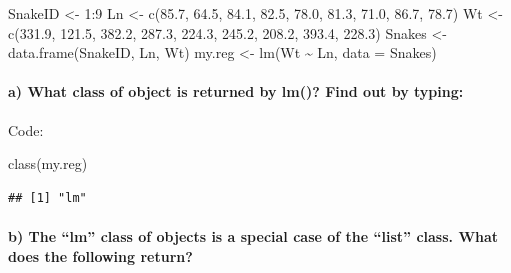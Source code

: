 \documentclass[
]{article}
\newenvironment{Shaded}{\begin{snugshade}}{\end{snugshade}}
\newcommand{\AttributeTok}[1]{\textcolor[rgb]{0.77,0.63,0.00}{#1}}
\newcommand{\DecValTok}[1]{\textcolor[rgb]{0.00,0.00,0.81}{#1}}
\newcommand{\FloatTok}[1]{\textcolor[rgb]{0.00,0.00,0.81}{#1}}
\newcommand{\FunctionTok}[1]{\textcolor[rgb]{0.00,0.00,0.00}{#1}}
\newcommand{\NormalTok}[1]{#1}
\newcommand{\OtherTok}[1]{\textcolor[rgb]{0.56,0.35,0.01}{#1}}
\newcommand{\SpecialCharTok}[1]{\textcolor[rgb]{0.00,0.00,0.00}{#1}}
\begin{document}
\begin{Shaded}
\begin{Highlighting}[]
\NormalTok{SnakeID }\OtherTok{\textless{}{-}} \DecValTok{1}\SpecialCharTok{:}\DecValTok{9}
\NormalTok{Ln }\OtherTok{\textless{}{-}} \FunctionTok{c}\NormalTok{(}\FloatTok{85.7}\NormalTok{, }\FloatTok{64.5}\NormalTok{, }\FloatTok{84.1}\NormalTok{, }\FloatTok{82.5}\NormalTok{, }\FloatTok{78.0}\NormalTok{, }\FloatTok{81.3}\NormalTok{, }\FloatTok{71.0}\NormalTok{, }\FloatTok{86.7}\NormalTok{, }\FloatTok{78.7}\NormalTok{)}
\NormalTok{Wt }\OtherTok{\textless{}{-}}
  \FunctionTok{c}\NormalTok{(}\FloatTok{331.9}\NormalTok{, }\FloatTok{121.5}\NormalTok{, }\FloatTok{382.2}\NormalTok{, }\FloatTok{287.3}\NormalTok{, }\FloatTok{224.3}\NormalTok{, }\FloatTok{245.2}\NormalTok{, }\FloatTok{208.2}\NormalTok{, }\FloatTok{393.4}\NormalTok{, }\FloatTok{228.3}\NormalTok{)}
\NormalTok{Snakes }\OtherTok{\textless{}{-}} \FunctionTok{data.frame}\NormalTok{(SnakeID, Ln, Wt)}
\NormalTok{my.reg }\OtherTok{\textless{}{-}} \FunctionTok{lm}\NormalTok{(Wt }\SpecialCharTok{\textasciitilde{}}\NormalTok{ Ln, }\AttributeTok{data =}\NormalTok{ Snakes)}
\end{Highlighting}
\end{Shaded}

\hypertarget{a-what-class-of-object-is-returned-by-lm-find-out-by-typing}{%
\paragraph{a) What class of object is returned by lm()? Find out by
typing:}\label{a-what-class-of-object-is-returned-by-lm-find-out-by-typing}}

\hfill\break
Code:

\begin{Shaded}
\begin{Highlighting}[]
\FunctionTok{class}\NormalTok{(my.reg)}
\end{Highlighting}
\end{Shaded}

\begin{verbatim}
## [1] "lm"
\end{verbatim}

\hypertarget{b-the-lm-class-of-objects-is-a-special-case-of-the-list-class.-what-does-the-following-return}{%
\paragraph{b) The ``lm'' class of objects is a special case of the
``list'' class. What does the following
return?}\label{b-the-lm-class-of-objects-is-a-special-case-of-the-list-class.-what-does-the-following-return}}
\end{document}
